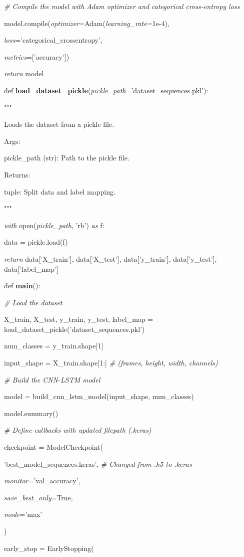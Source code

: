 \documentclass[
]{article}
\begin{document}
\emph{\# Compile the model with Adam optimizer and categorical cross-entropy loss}

model.compile(\emph{optimizer}=Adam(\emph{learning\_rate}=1e-4),

\emph{loss}='categorical\_crossentropy',

\emph{metrics}={[}'accuracy'{]})

\emph{return} model

def \textbf{load\_dataset\_pickle}(\emph{pickle\_path}='dataset\_sequences.pkl'):

"""

Loads the dataset from a pickle file.

Args:

pickle\_path (str): Path to the pickle file.

Returns:

tuple: Split data and label mapping.

"""

\emph{with} open(\emph{pickle\_path}, 'rb') \emph{as} f:

data = pickle.load(f)

\emph{return} data{[}'X\_train'{]}, data{[}'X\_test'{]}, data{[}'y\_train'{]}, data{[}'y\_test'{]}, data{[}'label\_map'{]}

def \textbf{main}():

\emph{\# Load the dataset}

X\_train, X\_test, y\_train, y\_test, label\_map = load\_dataset\_pickle('dataset\_sequences.pkl')

num\_classes = y\_train.shape{[}1{]}

input\_shape = X\_train.shape{[}1:{]} \emph{\# (frames, height, width, channels)}

\emph{\# Build the CNN-LSTM model}

model = build\_cnn\_lstm\_model(input\_shape, num\_classes)

model.summary()

\emph{\# Define callbacks with updated filepath (.keras)}

checkpoint = ModelCheckpoint(

'best\_model\_sequences.keras', \emph{\# Changed from .h5 to .keras}

\emph{monitor}='val\_accuracy',

\emph{save\_best\_only}=True,

\emph{mode}='max'

)

early\_stop = EarlyStopping(
\end{document}
